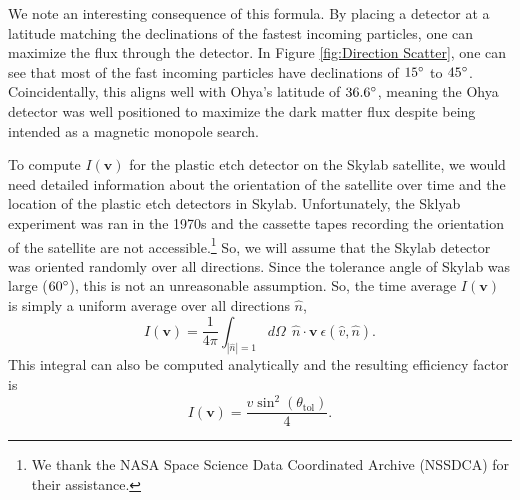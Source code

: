\documentclass[12pt]{article}
\begin{document}
We note an interesting consequence of this formula. By placing a detector at a latitude matching the declinations of the fastest incoming particles, one can maximize the flux through the detector. In Figure \ref{fig:Direction Scatter}, one can see that most of the fast incoming particles have declinations of $15\degree$ to $45\degree$. Coincidentally, this aligns well with Ohya's latitude of $36.6 \degree$, meaning the Ohya detector was well positioned to maximize the dark matter flux despite being intended as a magnetic monopole search.

To compute $I(\mathbf{v})$ for the plastic etch detector on the Skylab satellite, we would need detailed information about the orientation of the satellite over time and the location of the plastic etch detectors in Skylab. Unfortunately, the Sklyab experiment was ran in the 1970s and the cassette tapes recording the orientation of the satellite are not accessible.\footnote{We thank the NASA Space Science Data Coordinated Archive (NSSDCA) for their assistance.} So, we will assume that the Skylab detector was oriented randomly over all directions. Since the tolerance angle of Skylab was large ($60\degree$), this is not an unreasonable assumption. So, the time average $I(\mathbf{v})$ is simply a uniform average over all directions $\hat{n}$,
\begin{equation}
    I(\mathbf{v})=\frac{1}{4\pi}\int_{|\hat{n}|=1} d\Omega \ \ \hat{n} \cdot \mathbf{v} \ \epsilon( \hat{v}, \hat{n} ) .
\end{equation}
This integral can also be computed analytically and the resulting efficiency factor is
\begin{equation}
I(\mathbf{v})=\frac{v\sin^2(\theta_{\mathrm{tol}})}{4} .
\end{equation}
\end{document}
